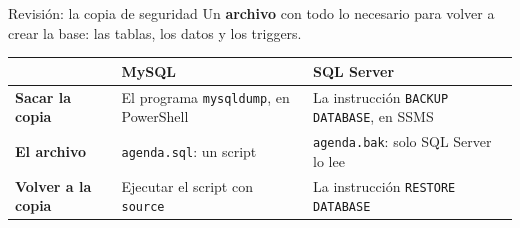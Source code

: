 \documentclass[aspectratio=169,10pt,c]{beamer}
\begin{document}
\begin{frame}{Revisión: la copia de seguridad}
\small Un \textbf{archivo} con todo lo necesario para volver a crear la base: las tablas, los datos y los triggers.
\vspace{0.25cm}
\begin{center}
\end{center}
\vspace{0.1cm}
\begin{center}
\footnotesize
\renewcommand{\arraystretch}{1.3}
\begin{tabular}{@{}>{\bfseries}l>{\raggedright}p{4.7cm}>{\raggedright\arraybackslash}p{4.7cm}@{}}
\toprule
 & MySQL & SQL Server \\
\midrule
Sacar la copia & El programa \texttt{mysqldump}, en PowerShell & La instrucción \texttt{BACKUP DATABASE}, en SSMS \\
El archivo & \texttt{agenda.sql}: un script & \texttt{agenda.bak}: solo SQL Server lo lee \\
Volver a la copia & Ejecutar el script con \texttt{source} & La instrucción \texttt{RESTORE DATABASE} \\
\bottomrule
\end{tabular}
\end{center}
\vspace{0.05cm}
\end{frame}
\end{document}
